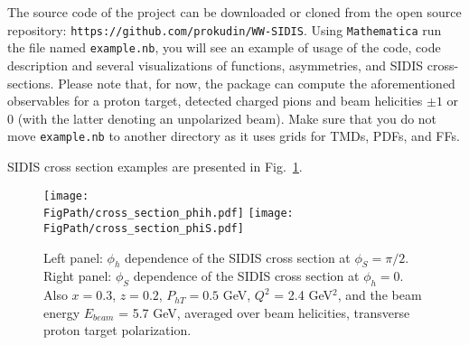 \documentclass[a4paper,11pt]{article}
\def\Phperp{P_{hT}}
\newcommand*{\FigPath}{./figs}%
\newcommand*{\BibPath}{.}%
\begin{document}
The source code of the project can be downloaded or cloned from the
open source repository: \texttt{https://github.com/prokudin/WW-SIDIS}.
Using \texttt{Mathematica}  run the  file named \texttt{example.nb},
you will see an example of usage of the code, code description and
several visualizations of functions, asymmetries, and SIDIS cross-sections.
Please note that, for now, the package can compute the aforementioned
observables for a proton target, detected charged pions and beam
helicities $\pm1$ or $0$ (with the latter denoting an unpolarized beam).
Make sure that you do not move \texttt{example.nb} to another directory
as it uses grids for TMDs, PDFs, and FFs.

SIDIS cross section examples are presented in Fig.~\ref{fig:package}.


\begin{figure}[t]
\centering
\texttt{[image: \\FigPath/cross\_section\_phih.pdf]}
\texttt{[image: \\FigPath/cross\_section\_phiS.pdf]}
\caption{\label{fig:package}
	Left panel:
	$\phi_h$ dependence of the SIDIS cross section at $\phi_S = \pi/2$.
	Right panel:
	$\phi_S$ dependence of the SIDIS cross section at $\phi_h = 0$.
	Also $x = 0.3$, $z=0.2$, $\Phperp = 0.5$ GeV,
	$Q^2$ = 2.4 GeV$^2$, and the beam energy $E_{beam}$ = 5.7 GeV,
	averaged over beam helicities,  transverse proton target polarization.}
\end{figure}





\end{document}
